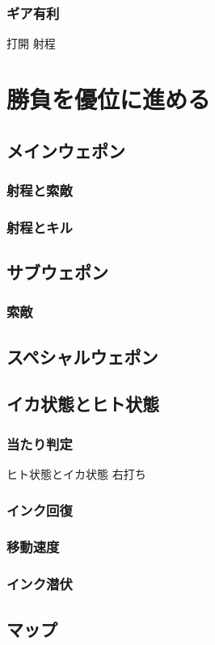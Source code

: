 \documentclass[a4paper,11pt]{jsbook}
\begin{document}
\subsection{ギア有利}
打開
射程

\chapter{勝負を優位に進める}
\section{メインウェポン}
\subsection{射程と索敵}
\subsection{射程とキル}
\section{サブウェポン}
\subsection{索敵}
\section{スペシャルウェポン}
\section{イカ状態とヒト状態}
\subsection{当たり判定}
ヒト状態とイカ状態
右打ち
\subsection{インク回復}
\subsection{移動速度}
\subsection{インク潜伏}
\section{マップ}
\end{document}
